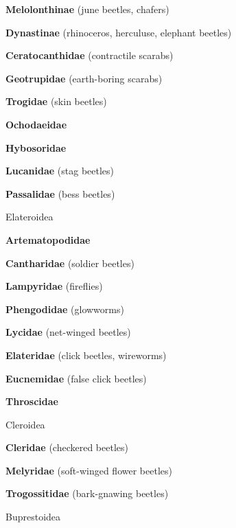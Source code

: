 \documentclass[letterpaper,10pt]{article}
\begin{document}
{\makebox[0.8cm]{}  \textbf{Melolonthinae} (june beetles, chafers) \par
\makebox[0.8cm]{}  \textbf{Dynastinae} (rhinoceros, herculuse, elephant beetles) \par
\makebox[0.6cm]{}  \textbf{Ceratocanthidae} (contractile scarabs) \par
\makebox[0.6cm]{}  \textbf{Geotrupidae} (earth-boring scarabs) \par
\makebox[0.6cm]{}  \textbf{Trogidae} (skin beetles) \par
\makebox[0.6cm]{}  \textbf{Ochodaeidae} \par
\makebox[0.6cm]{}  \textbf{Hybosoridae} \par
\makebox[0.6cm]{}  \textbf{Lucanidae} (stag beetles) \par
\makebox[0.6cm]{}  \textbf{Passalidae} (bess beetles) \par
\makebox[0.40cm]{}  Elateroidea \par
\makebox[0.6cm]{}  \textbf{Artematopodidae} \par
\makebox[0.6cm]{}  \textbf{Cantharidae} (soldier beetles) \par
\makebox[0.6cm]{}  \textbf{Lampyridae} (fireflies) \par
\makebox[0.6cm]{}  \textbf{Phengodidae} (glowworms) \par
\makebox[0.6cm]{}  \textbf{Lycidae} (net-winged beetles) \par
\makebox[0.6cm]{}  \textbf{Elateridae} (click beetles, wireworms) \par
\makebox[0.6cm]{}  \textbf{Eucnemidae} (false click beetles) \par
\makebox[0.6cm]{}  \textbf{Throscidae} \par
\makebox[0.40cm]{}  Cleroidea \par
\makebox[0.6cm]{}  \textbf{Cleridae} (checkered beetles) \par
\makebox[0.6cm]{}  \textbf{Melyridae} (soft-winged flower beetles) \par
\makebox[0.6cm]{}  \textbf{Trogossitidae} (bark-gnawing beetles) \par
\makebox[0.40cm]{}  Buprestoidea \par
}
\end{document}
